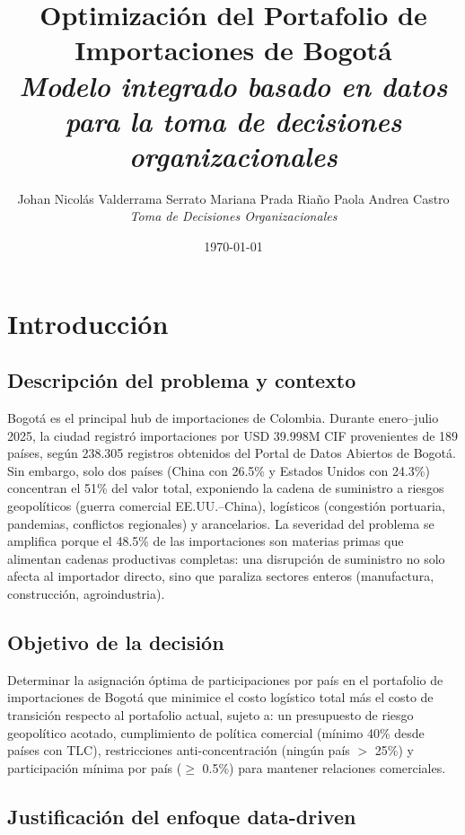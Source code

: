 \documentclass[11pt,a4paper]{article}
\title{\vspace{-1.8cm}
    \textcolor{azuloscuro}{\textbf{\Large Optimización del Portafolio de Importaciones de Bogotá}} \\[0.1cm]
    \normalsize\textcolor{azulclaro}{\textit{Modelo integrado basado en datos para la toma de decisiones organizacionales}}}
\author{\small Johan Nicolás Valderrama Serrato \quad Mariana Prada Riaño \quad Paola Andrea Castro \\[0.05cm]
\footnotesize\textit{Toma de Decisiones Organizacionales}}
\date{\footnotesize\today}
\begin{document}
\maketitle
\thispagestyle{fancy}
\vspace{-1cm}

\section{Introducción}

\subsection{Descripción del problema y contexto}

Bogotá es el principal hub de importaciones de Colombia. Durante enero--julio 2025, la ciudad registró importaciones por USD 39.998M CIF provenientes de 189 países, según 238.305 registros obtenidos del Portal de Datos Abiertos de Bogotá. Sin embargo, solo dos países (China con 26.5\% y Estados Unidos con 24.3\%) concentran el 51\% del valor total, exponiendo la cadena de suministro a riesgos geopolíticos (guerra comercial EE.UU.--China), logísticos (congestión portuaria, pandemias, conflictos regionales) y arancelarios. La severidad del problema se amplifica porque el 48.5\% de las importaciones son materias primas que alimentan cadenas productivas completas: una disrupción de suministro no solo afecta al importador directo, sino que paraliza sectores enteros (manufactura, construcción, agroindustria).

\subsection{Objetivo de la decisión}

Determinar la asignación óptima de participaciones por país en el portafolio de importaciones de Bogotá que minimice el costo logístico total más el costo de transición respecto al portafolio actual, sujeto a: un presupuesto de riesgo geopolítico acotado, cumplimiento de política comercial (mínimo 40\% desde países con TLC), restricciones anti-concentración (ningún país $>$ 25\%) y  participación mínima por país ($\geq$ 0.5\%) para mantener relaciones comerciales.

\subsection{Justificación del enfoque data-driven}
\end{document}
